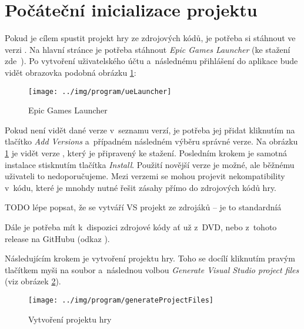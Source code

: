 
\section{Počáteční inicializace projektu}

Pokud je cílem spustit projekt hry ze zdrojových kódů, je potřeba si stáhnout \UE{} ve verzi . Na hlavní stránce \UE{} je potřeba stáhnout \textit{Epic Games Launcher} (ke stažení zde~\citep{ue_download}). Po vytvoření uživatelského účtu a~následnému přihlášení do aplikace bude vidět obrazovka podobná obrázku \ref{fig:ueLauncher}:


\begin{figure}[!ht]\centering
\texttt{[image: ../img/program/ueLauncher]}

\caption{Epic Games Launcher}
\label{fig:ueLauncher}

\end{figure}

\FloatBarrier

Pokud není vidět \UE{} dané verze v~seznamu verzí, je potřeba jej přidat kliknutím na tlačítko \textit{Add Versions} a~případném následném výběru správné verze. Na obrázku \ref{fig:ueLauncher} je vidět \UE{} verze , který je připravený ke stažení. Posledním krokem je samotná instalace stisknutím tlačítka \textit{Install}. Použití novější verze \UEu{} je možné, ale běžnému uživateli to nedoporučujeme. Mezi verzemi se mohou projevit nekompatibility v~kódu, které je mnohdy nutné řešit zásahy přímo do zdrojových kódů hry.

TODO lépe popsat, že se vytváří VS projekt ze zdrojáků -- je to standardníá

Dále je potřeba mít k~dispozici zdrojové kódy ať už z~DVD, nebo z~tohoto release na GitHubu (odkaz \citep{gh_finalRelease}).
 
Následujícím krokem je vytvoření projektu hry. Toho se docílí kliknutím pravým tlačítkem myši na soubor  a~následnou volbou \textit{Generate Visual Studio project files} (viz obrázek \ref{fig:generateProjectFiles}). 

\begin{figure}[!ht]\centering
\texttt{[image: ../img/program/generateProjectFiles]}

\caption{Vytvoření projektu hry}
\label{fig:generateProjectFiles}

\end{figure}


